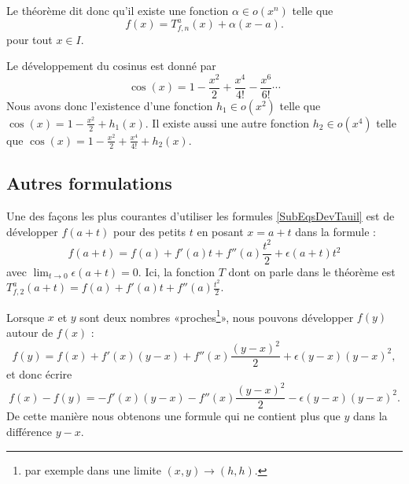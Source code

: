 Le théorème dit donc qu'il existe une fonction $\alpha\in o(x^n)$ telle que
\begin{equation}
	f(x)=T^a_{f,n}(x)+\alpha(x-a).
\end{equation}
pour tout $x\in I$. 

\begin{example}
	Le développement du cosinus est donné par
	\begin{equation}
		\cos(x)=1-\frac{ x^2 }{ 2 }+\frac{ x^4 }{ 4! }-\frac{ x^6 }{ 6! }\cdots
	\end{equation}
	Nous avons donc l'existence d'une fonction $h_1\in o(x^2)$ telle que $\cos(x)=1-\frac{ x^2 }{ 2 }+h_1(x)$. Il existe aussi une autre fonction $h_2\in o(x^4)$ telle que $\cos(x)=1-\frac{ x^2 }{ 2 }+\frac{ x^4 }{ 4! }+h_2(x)$.
\end{example}

\subsection{Autres formulations}

\begin{example}		\label{ExempleUtlDev}
	Une des façons les plus courantes d'utiliser les formules \eqref{SubEqsDevTauil} est de développer $f(a+t)$ pour des petits $t$ en posant $x=a+t$ dans la formule :
	\begin{equation}	\label{EqDevfautouraeps}
		f(a+t)=f(a)+f'(a)t+f''(a)\frac{ t^2 }{ 2 }+\epsilon(a+t)t^2
	\end{equation}
	avec $\lim_{t\to 0} \epsilon(a+t)=0$. Ici, la fonction $T$ dont on parle dans le théorème est $T_{f,2}^a(a+t)=f(a)+f'(a)t+f''(a)\frac{ t^2 }{2}$.

	Lorsque $x$ et $y$ sont deux nombres «proches\footnote{par exemple dans une limite $(x,y)\to(h,h)$.}», nous pouvons développer $f(y)$ autour de $f(x)$ :
	\begin{equation}		\label{Eqfydevfx}
		f(y)=f(x)+f'(x)(y-x)+f''(x)\frac{ (y-x)^2 }{ 2 }+\epsilon(y-x)(y-x)^2,
	\end{equation}
	et donc écrire
	\begin{equation}
		f(x)-f(y)=-f'(x)(y-x)-f''(x)\frac{ (y-x)^2 }{ 2 }-\epsilon(y-x)(y-x)^2.
	\end{equation}
	De cette manière nous obtenons une formule qui ne contient plus que $y$ dans la différence $y-x$.
\end{example}

